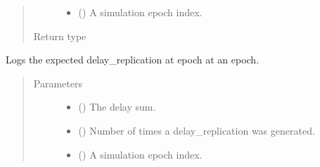 \documentclass[letterpaper,10pt,english]{sphinxmanual}
\begin{document}
\begin{fulllineitems}
\begin{fulllineitems}
\begin{quote}
\begin{description}
\begin{itemize}
\item {} 
 () \textendash{} A simulation epoch index.

\end{itemize}

\item[{Return type}] \leavevmode
{}

\end{description}\end{quote}

\end{fulllineitems}


\begin{fulllineitems}
\label{\detokenize{app.domain.helpers:app.domain.helpers.smart_dataclasses.LoggingData.log_replication_delay}}
Logs the expected delay\_replication at epoch at an epoch.
\begin{quote}\begin{description}
\item[{Parameters}] \leavevmode\begin{itemize}
\item {} 
 () \textendash{} The delay sum.

\item {} 
 () \textendash{} Number of times a delay\_replication was generated.

\item {} 
 () \textendash{} A simulation epoch index.

\end{itemize}


\end{description}
\end{quote}
\end{fulllineitems}
\end{fulllineitems}
\end{document}
